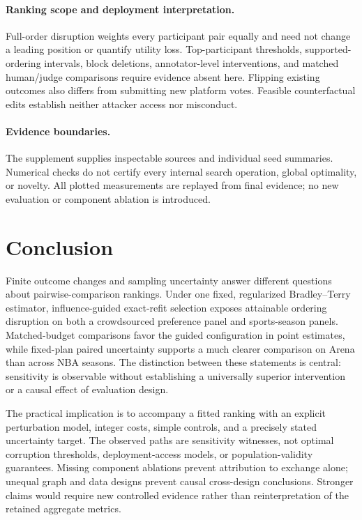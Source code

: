 \documentclass{article}
\begin{document}
\paragraph{Ranking scope and deployment interpretation.}
Full-order disruption weights every participant pair equally and need not change a leading position or quantify utility loss. Top-participant thresholds, supported-ordering intervals, block deletions, annotator-level interventions, and matched human/judge comparisons require evidence absent here. Flipping existing outcomes also differs from submitting new platform votes. Feasible counterfactual edits establish neither attacker access nor misconduct.

\paragraph{Evidence boundaries.}
The supplement supplies inspectable sources and individual seed summaries. Numerical checks do not certify every internal search operation, global optimality, or novelty. All plotted measurements are replayed from final evidence; no new evaluation or component ablation is introduced.

\section{Conclusion}
Finite outcome changes and sampling uncertainty answer different questions about pairwise-comparison rankings. Under one fixed, regularized Bradley--Terry estimator, influence-guided exact-refit selection exposes attainable ordering disruption on both a crowdsourced preference panel and sports-season panels. Matched-budget comparisons favor the guided configuration in point estimates, while fixed-plan paired uncertainty supports a much clearer comparison on Arena than across NBA seasons. The distinction between these statements is central: sensitivity is observable without establishing a universally superior intervention or a causal effect of evaluation design.

The practical implication is to accompany a fitted ranking with an explicit perturbation model, integer costs, simple controls, and a precisely stated uncertainty target. The observed paths are sensitivity witnesses, not optimal corruption thresholds, deployment-access models, or population-validity guarantees. Missing component ablations prevent attribution to exchange alone; unequal graph and data designs prevent causal cross-design conclusions. Stronger claims would require new controlled evidence rather than reinterpretation of the retained aggregate metrics.
\end{document}
